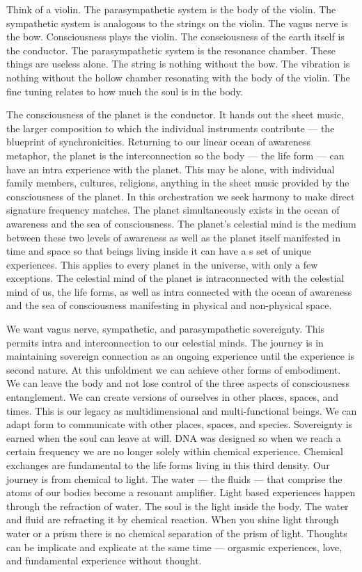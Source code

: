\documentclass[letterpaper,9pt,twoside,titlepage,onecolumn,openany]{book}
\begin{document}
Think of a violin. The parasympathetic system is the body of the violin.
The sympathetic system is analogous to the strings on the violin. The
vagus nerve is the bow. Consciousness plays the violin. The
consciousness of the earth itself is the conductor. The parasympathetic
system is the resonance chamber. These things are useless alone. The
string is nothing without the bow. The vibration is nothing without the
hollow chamber resonating with the body of the violin. The fine tuning
relates to how much the soul is in the body.

The consciousness of the planet is the conductor. It hands out the sheet
music, the larger composition to which the individual instruments
contribute --- the blueprint of synchronicities. Returning to our linear
ocean of awareness metaphor, the planet is the interconnection so the
body --- the life form --- can have an intra experience with the planet.
This may be alone, with individual family members, cultures, religions,
anything in the sheet music provided by the consciousness of the planet.
In this orchestration we seek harmony to make direct signature frequency
matches. The planet simultaneously exists in the ocean of awareness and
the sea of consciousness. The planet's celestial mind is the medium
between these two levels of awareness as well as the planet itself
manifested in time and space so that beings living inside it can have a
s set of unique experiences. This applies to every planet in the
universe, with only a few exceptions. The celestial mind of the planet
is intraconnected with the celestial mind of us, the life forms, as well
as intra connected with the ocean of awareness and the sea of
consciousness manifesting in physical and non-physical space.

We want vagus nerve, sympathetic, and parasympathetic sovereignty. This
permits intra and interconnection to our celestial minds. The journey is
in maintaining sovereign connection as an ongoing experience until the
experience is second nature. At this unfoldment we can achieve other
forms of embodiment. We can leave the body and not lose control of the
three aspects of consciousness entanglement. We can create versions of
ourselves in other places, spaces, and times. This is our legacy as
multidimensional and multi-functional beings. We can adapt form to
communicate with other places, spaces, and species. Sovereignty is
earned when the soul can leave at will. DNA was designed so when we
reach a certain frequency we are no longer solely within chemical
experience. Chemical exchanges are fundamental to the life forms living
in this third density. Our journey is from chemical to light. The water
--- the fluids --- that comprise the atoms of our bodies become a
resonant amplifier. Light based experiences happen through the
refraction of water. The soul is the light inside the body. The water
and fluid are refracting it by chemical reaction. When you shine light
through water or a prism there is no chemical separation of the prism of
light. Thoughts can be implicate and explicate at the same time ---
orgasmic experiences, love, and fundamental experience without thought.
\end{document}
